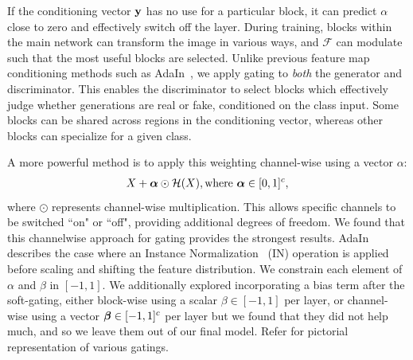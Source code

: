 If the conditioning vector ${\bf y}$ has no use for a particular block, it can predict $\alpha$ close to zero and effectively switch off the layer.
During training, blocks within the main network can transform the image in various ways, and $\mathcal{F}$ can modulate such that the most useful blocks are selected. 
Unlike previous feature map conditioning methods such as AdaIn~\cite{ulyanovinstance}, we apply gating to \emph{both} the generator and discriminator. 
This enables the discriminator to select blocks which effectively judge whether generations are real or fake, conditioned on the class input.
Some blocks can be shared across regions in the conditioning vector, whereas other blocks can specialize for a given class.

A more powerful method is to apply this weighting channel-wise using a vector {\boldmath$\alpha$}: %
\begin{align}
X + \mbox{\boldmath $\alpha$} \odot \mathcal{H}(X), \text{where } \mbox{\boldmath $\alpha$} \in [0,1]^c, 
\end{align}
where $\odot$ represents channel-wise multiplication. This allows specific channels to be switched ``on" or ``off", providing additional degrees of freedom.
We found that this channelwise approach for gating provides the strongest results. 
AdaIn describes the case where an Instance Normalization~\cite{ulyanovinstance} (IN) operation is applied before scaling and shifting the feature distribution.
We constrain each element of {\boldmath $\alpha$} and {\boldmath $\beta$} in $[-1, 1]$.
We additionally explored incorporating a bias term after the soft-gating, either block-wise using a scalar $\beta \in [-1,1]$ per layer, or channel-wise using a vector $\mbox{\boldmath $\beta$} \in [-1, 1]^c$ per layer but we found that they did not help much, and so we leave them out of our final model. Refer  for pictorial representation of various gatings.


